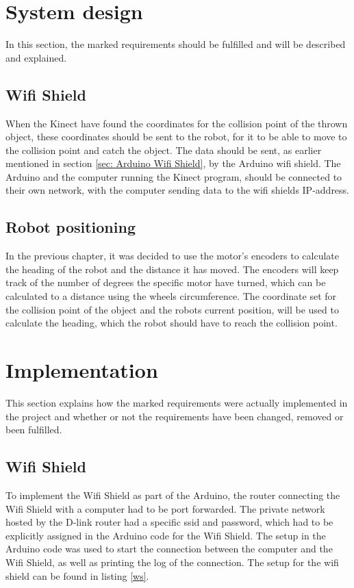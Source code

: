 \section{System design}
 \label{sec:i2System design} 
In this section, the marked requirements should be fulfilled and will be described and explained.  

\subsection{Wifi Shield}
\label{sec:Wifi Shield SD}
When the Kinect have found the coordinates for the collision point of the thrown object, these coordinates should be sent to the robot, for it to be able to move to the collision point and catch the object. 
The data should be sent, as earlier mentioned in section \ref{sec: Arduino Wifi Shield}, by the Arduino wifi shield. The Arduino and the computer running the Kinect program, should be connected to their own network, with the computer sending data to the wifi shields IP-address.

\subsection{Robot positioning}
\label{sec:Robot positioning System Design}
In the previous chapter, it was decided to use the motor's encoders to calculate the heading of the robot and the distance it has moved. The encoders will keep track of the number of degrees the specific motor have turned, which can be calculated to a distance using the wheels circumference.
The coordinate set for the collision point of the object and the robots current position, will be used to calculate the heading, which the robot should have to reach the collision point. 

\section{Implementation}
\label{sec:i2Implementation}
This section explains how the marked requirements were actually implemented in the project and whether or not the requirements have been changed, removed or been fulfilled. 

\subsection{Wifi Shield}
\label{sec:Wifi Shield Implementation}
To implement the Wifi Shield as part of the Arduino, the router connecting the Wifi Shield with a computer had to be port forwarded. The private network hosted by the D-link router had a specific ssid and password, which had to be explicitly assigned in the Arduino code for the Wifi Shield. The setup in the Arduino code was used to start the connection between the computer and the Wifi Shield, as well as printing the log of the connection. The setup for the wifi shield can be found in listing \ref{ws}.

